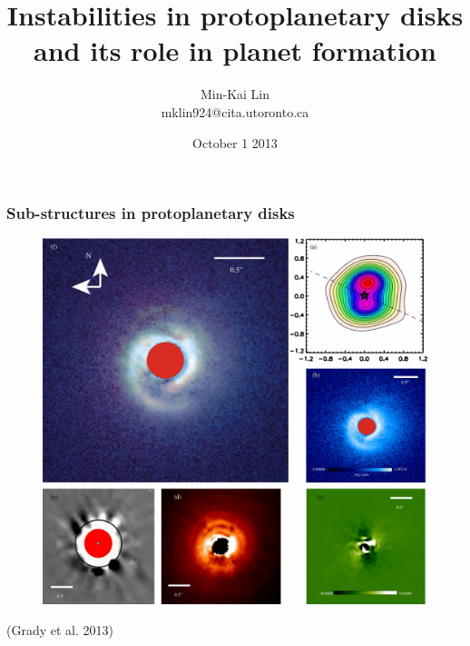 \documentclass[10pt]{beamer}
\title[Disk instabilities]{Instabilities in protoplanetary disks and
  its role in planet formation}
\author[M-K. Lin]{Min-Kai Lin\\mklin924@cita.utoronto.ca}
\institute[CITA]{ Canadian Institute for Theoretical Astrophysics}
\date{October 1 2013}
\begin{document}
\begin{frame}[plain]
  \titlepage
\end{frame}


\begin{frame}
   \frametitle{Sub-structures in protoplanetary disks}
   \centering
   \begin{figure}
     \includegraphics[width=0.6\linewidth]{spiral.jpg}
   \end{figure} 
   (Grady et al. 2013)
\end{frame}
\end{document}
